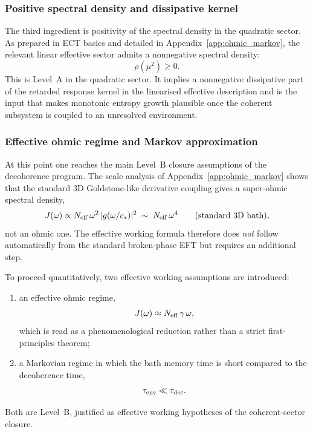 \subsubsection*{Positive spectral density and dissipative kernel}

The third ingredient is positivity of the spectral density in the
quadratic sector.
As prepared in ECT basics and detailed in Appendix~\ref{app:ohmic_markov},
the relevant linear effective sector admits a nonnegative spectral
density:
\begin{equation}
  \label{eq:qs_rho_positive}
  \rho(\mu^2) \ge 0.
\end{equation}
This is Level~A in the quadratic sector.
It implies a nonnegative dissipative part of the retarded response
kernel in the linearised effective description and is the input that
makes monotonic entropy growth plausible once the coherent subsystem
is coupled to an unresolved environment.

\subsubsection*{Effective ohmic regime and Markov approximation}

At this point one reaches the main Level~B closure assumptions of the
decoherence program.
The scale analysis of Appendix~\ref{app:ohmic_markov} shows that the
standard 3D Goldstone-like derivative coupling gives a super-ohmic
spectral density,
\begin{equation}
  \label{eq:qs_super_ohmic}
  J(\omega) \propto N_{\rm eff}\,\omega^2\,|g(\omega/c_*)|^2
  \;\sim\; N_{\rm eff}\,\omega^4
  \qquad (\text{standard 3D bath}),
\end{equation}
not an ohmic one.
The effective working formula therefore does \emph{not} follow
automatically from the standard broken-phase EFT but requires an
additional step.

To proceed quantitatively, two effective working assumptions are
introduced:
\begin{enumerate}[label=(\roman*)]
  \item an effective ohmic regime,
    \begin{equation}
      \label{eq:qs_ohmic}
      J(\omega) \approx N_{\rm eff}\,\gamma\,\omega,
    \end{equation}
    which is read as a phenomenological reduction rather than a
    strict first-principles theorem;
  \item a Markovian regime in which the bath memory time is short
    compared to the decoherence time,
    \begin{equation}
      \label{eq:qs_markov}
      \tau_{\rm env} \ll \tau_{\rm dec}.
    \end{equation}
\end{enumerate}
Both are Level~B, justified as effective working hypotheses of the
coherent-sector closure.

